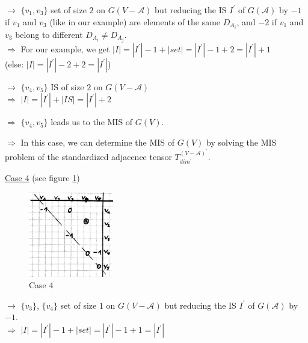 \documentclass{article}
\newtheorem*{theorem A}{Theorem A}
\newtheorem*{theorem B}{N\"olker's Theorem}
\theoremstyle{remark}
\theoremstyle{remark}
\begin{document}
\begin{enumerate}
    \vspace{0.3cm}
    $\rightarrow$ $\{ v_{1}, v_{3} \}$ set of size $2$ on $G\left(V - \mathcal{A}\right)$ but reducing the IS $I^{\prime}$ of $G\left(\mathcal{A}\right)$ by $-1$ if $v_{1}$ and $v_{3}$ (like in our example) are elements of the same $D_{A_{i}}$, and $-2$ if $v_{1}$ and $v_{3}$ belong to different $D_{A_{i}} \neq D_{A_{j}}$.\\
        $\Rightarrow$ For our example, we get $|I| = |I^{\prime}| - 1 + |set| = |I^{\prime}| - 1 + 2 = |I^{\prime}| + 1$\\
            (else: $|I| = |I^{\prime}| - 2 + 2 = |I^{\prime}|$)

    \vspace{0.3cm}
    $\rightarrow$ $\{ v_{4}, v_{5} \}$ IS of size $2$ on $G\left(V - \mathcal{A}\right)$\\
        $\Rightarrow$ $|I| = |I^{\prime}| + |IS| = |I^{\prime}| + 2$

    \vspace{0.3cm}
    $\Rightarrow$ $\{ v_{4}, v_{5} \}$ leads us to the MIS of $G\left(V\right)$.

    \vspace{0.3cm}
    $\Rightarrow$ In this case, we can determine the MIS of $G\left(V\right)$ by solving the MIS problem of the standardized adjacence tensor $T^{\left(V - \mathcal{A}\right)^{\prime}}_{dim^{\prime}}$.



    \vspace{0.3cm}
    \underline{Case 4} (see figure \ref{fig:case4})\\

     \begin{figure}[ht]
	    \centering
        \includegraphics[width=0.33\textwidth]{images/case4.png}
	    \caption{Case 4}
	\label{fig:case4}
    \end{figure}

    $\rightarrow$ $\{ v_{3} \}$, $\{ v_{4} \}$ set of size $1$ on $G\left(V - \mathcal{A}\right)$ but reducing the IS $I^{\prime}$ of $G\left(\mathcal{A}\right)$ by $-1$.\\
        $\Rightarrow$ $|I| = |I^{\prime}| - 1 + |set| = |I^{\prime}| - 1 + 1 = |I^{\prime}|$


\end{enumerate}
\end{document}
